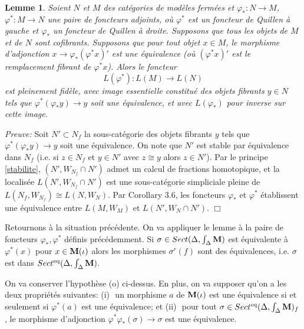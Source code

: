 \documentclass[12pt]{article}
\newcommand{\eop}{\hfill $\Box$\vspace{.1in}}
\newtheorem{lemme}[lemma]{Lemme}
\newcommand{\mm}{{\bf M}}
\begin{document}
\begin{lemme}
\label{dpq1}
Soient $N$ et $M$ des cat\'egories de mod\`eles ferm\'ees et
$\varphi _{\ast} : N\rightarrow M$, $\varphi ^{\ast} : M\rightarrow N$ une
paire de foncteurs
adjoints, o\`u $\varphi ^{\ast}$ est un foncteur de Quillen \`a gauche et
$\varphi _{\ast}$ un
foncteur de Quillen \`a droite. Supposons que tous les objets de $M$ et
de $N$ sont cofibrants. Supposons que pour tout objet $x\in M$, le morphisme
d'adjonction $x\rightarrow \varphi _{\ast} (\varphi ^{\ast} x)'$ est une
\'equivalence (o\`u $(\varphi ^{\ast}
x)'$ est le remplacement fibrant de $\varphi ^{\ast} x$).
\newline Alors le foncteur
$$
L(\varphi ^{\ast} ) : L(M)\rightarrow L(N)
$$
est pleinement fid\`ele, avec image essentielle
constitu\'e des objets  fibrants $y\in N$
tels que $\varphi ^{\ast} (\varphi _{\ast} y)\rightarrow y$ soit une
\'equivalence, et avec
$L(\varphi _{\ast} )$ pour inverse sur cette image.
\end{lemme}
{\em Preuve:}
Soit $N'\subset N_f$ la sous-cat\'egorie des objets
fibrants $y$ tels que $\varphi ^{\ast} (\varphi _{\ast} y)\rightarrow y$
soit une \'equivalence. On
note que $N'$ est stable par \'equivalence dans $N_f$ (i.e. si $z\in N_f$
et $y\in N'$ avec $z\cong y$ alors $z\in N'$). Par le principe \ref{stabilite},
$(N',W_{N_f}\cap N')$ admet un calcul de fractions homotopique, et la
localis\'ee
$L(N',W_{N_f}\cap N')$ est une sous-cat\'egorie simpliciale pleine de
$L(N_f,W_{N_f})\cong L(N,W_N)$. Par  \cite{DwyerKan2} Corollary 3.6, les
foncteurs $\varphi _{\ast}$ et $\varphi ^{\ast}$ \'etablissent une
\'equivalence entre $L(M, W_M)$
et $L(N', W_N\cap N')$.
\eop


Retournons \`a la situation pr\'ec\'edente. On va appliquer le lemme \`a
la paire de
foncteurs $\varphi _{\ast} , \varphi ^{\ast}$ d\'efinis pr\'ec\'edemment.
Si $\sigma \in
Sect (\Delta , \int _{\Delta} \mm )$ est \'equivalente \`a $\varphi ^{\ast}
(x)$ pour $x\in
\mm (\iota )$ alors les morphismes $\sigma ^r(f)$ sont des \'equivalences, i.e.
$\sigma$ est dans $Sect ^{\rm eq} (\Delta , \int _{\Delta} \mm )$.

On va conserver l'hypoth\`ese (o) ci-dessus.
En plus, on va supposer qu'on a les deux propri\'et\'es
suivantes: \newline
(i)\,\, un morphisme $a$ de $\mm (\iota )$ est une \'equivalence
si et seulement si $\varphi ^{\ast} (a)$ est une \'e\-qui\-va\-len\-ce; et
\newline
(ii)\,\, pour tout $\sigma \in Sect ^{\rm eq} (\Delta , \int _{\Delta} \mm )_f$,
le morphisme d'adjonction $\varphi ^{\ast} \varphi _{\ast} (\sigma )
\rightarrow \sigma$
est une \'equivalence.
\end{document}
